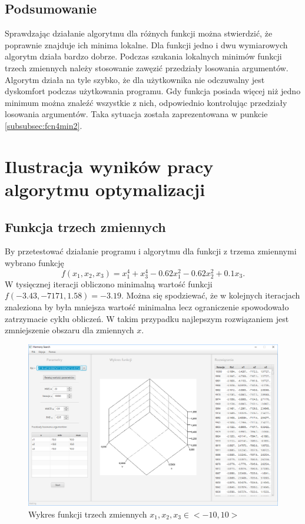 \documentclass[10pt, a4paper]{article}
\begin{document}
\subsection{Podsumowanie}
\label{subsec:podsumowanietestow}
Sprawdzając działanie algorytmu dla różnych funkcji można stwierdzić, że poprawnie znajduje ich minima lokalne. Dla funkcji jedno i dwu wymiarowych algorytm działa bardzo dobrze. Podczas szukania lokalnych minimów funkcji trzech zmiennych należy stosowanie zawęzić przedziały losowania argumentów. Algorytm działa na tyle szybko, że dla użytkownika nie odczuwalny jest dyskomfort podczas użytkowania programu. Gdy funkcja posiada więcej niż jedno minimum można znaleźć wszystkie z nich, odpowiednio kontrolując przedziały losowania argumentów. Taka sytuacja została zaprezentowana w punkcie \ref{subsubsec:fcn4min2}. 

\pagebreak

\section{Ilustracja wyników pracy algorytmu optymalizacji}

\subsection{Funkcja trzech zmiennych}
\label{subsec:trzyzmienne}
By przetestować działanie programu i algorytmu dla funkcji z trzema zmiennymi wybrano funkcję $$f(x_{1},x_{2},x_{3}) = x_{1}^{4}+x_{3}^{4}-0.62x_{1}^{2}-0.62x_{2}^{2}+0.1x_{3}.$$ W tysięcznej iteracji obliczono minimalną wartość funkcji $f(-3.43,-7171,1.58)=-3.19$. Można się spodziewać, że w kolejnych iteracjach znaleziona by była mniejsza wartość minimalna lecz ograniczenie spowodowało zatrzymacie cyklu obliczeń. W takim przypadku najlepszym rozwiązaniem jest zmniejszenie obszaru dla zmiennych $x$.
\begin{figure}[htbp]
	\centering
	\includegraphics[width=.6\textwidth]{images/41.PNG}
	\caption{Wykres funkcji trzech zmiennych $x_{1}, x_{2}, x_{3} \in <-10,10>$}
	\label{fig:41}
\end{figure}
\end{document}
